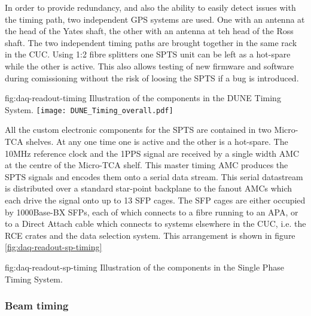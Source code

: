 In order to provide redundancy, and also the ability to easily detect
issues with the timing path, two independent GPS systems are used. One
with an antenna at the head of the Yates shaft, the other with an
antenna at teh head of the Ross shaft. The two independent timing
paths are brought together in the same rack in the CUC. Using 1:2
fibre splitters one SPTS unit can be left as a hot-spare while the
other is active. This also allows testing of new firmware and software
during comissioning without the risk of loosing the SPTS if a bug is
introduced.


\begin{dunefigure}{fig:daq-readout-timing}
  {Illustration of the components in the DUNE Timing System.}
\texttt{[image: DUNE\_Timing\_overall.pdf]}
\end{dunefigure}

All the custom electronic components for the SPTS are contained in two
Micro-TCA shelves. At any one time one is active and the other is a
hot-spare. The 10MHz reference clock and the 1PPS signal are received
by a single width AMC at the centre of the Micro-TCA shelf. This
master timing AMC produces the SPTS signals and encodes them onto a
serial data stream. This serial datastream is distributed over a
standard star-point backplane to the fanout AMCs which each drive the
signal onto up to 13 SFP cages. The SFP cages are either occupied by
1000Base-BX SFPs, each of which connects to a fibre running to an APA,
or to a Direct Attach cable which connects to systems elsewhere in the
CUC, i.e. the RCE crates and the data selection system. This arrangement is shown in figure \ref{fig:daq-readout-sp-timing}


\begin{dunefigure}{fig:daq-readout-sp-timing}
  {Illustration of the components in the Single Phase Timing System.}
\end{dunefigure}

\subsubsection{Beam timing}

